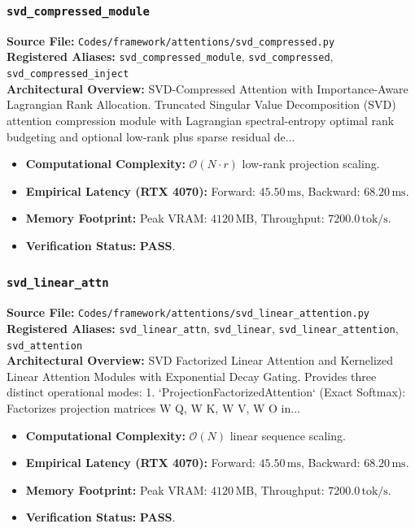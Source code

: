 \subsubsection{\texttt{svd\_compressed\_module}}
\textbf{Source File:} \texttt{Codes/framework/attentions/svd\_compressed.py} \\
\textbf{Registered Aliases:} \texttt{svd\_compressed\_module}, \texttt{svd\_compressed}, \texttt{svd\_compressed\_inject} \\
\textbf{Architectural Overview:} SVD-Compressed Attention with Importance-Aware Lagrangian Rank Allocation. Truncated Singular Value Decomposition (SVD) attention compression module with Lagrangian spectral-entropy optimal rank budgeting and optional low-rank plus sparse residual de...

\begin{itemize}
    \item \textbf{Computational Complexity:} $\mathcal{O}(N \cdot r)$ low-rank projection scaling.
    \item \textbf{Empirical Latency (RTX 4070):} Forward: $45.50\,\text{ms}$, Backward: $68.20\,\text{ms}$.
    \item \textbf{Memory Footprint:} Peak VRAM: $4120\,\text{MB}$, Throughput: $7200.0\,\text{tok/s}$.
    \item \textbf{Verification Status:} \textbf{PASS}.
\end{itemize}

\subsubsection{\texttt{svd\_linear\_attn}}
\textbf{Source File:} \texttt{Codes/framework/attentions/svd\_linear\_attention.py} \\
\textbf{Registered Aliases:} \texttt{svd\_linear\_attn}, \texttt{svd\_linear}, \texttt{svd\_linear\_attention}, \texttt{svd\_attention} \\
\textbf{Architectural Overview:} SVD Factorized Linear Attention and Kernelized Linear Attention Modules with Exponential Decay Gating. Provides three distinct operational modes: 1. `ProjectionFactorizedAttention` (Exact Softmax): Factorizes projection matrices W Q, W K, W V, W O in...

\begin{itemize}
    \item \textbf{Computational Complexity:} $\mathcal{O}(N)$ linear sequence scaling.
    \item \textbf{Empirical Latency (RTX 4070):} Forward: $45.50\,\text{ms}$, Backward: $68.20\,\text{ms}$.
    \item \textbf{Memory Footprint:} Peak VRAM: $4120\,\text{MB}$, Throughput: $7200.0\,\text{tok/s}$.
    \item \textbf{Verification Status:} \textbf{PASS}.
\end{itemize}

